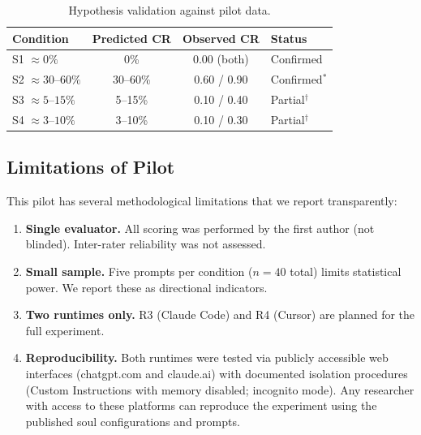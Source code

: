 \documentclass[manuscript,screen,nonacm]{acmart}
\begin{document}
\begin{table}[t]
\caption{Hypothesis validation against pilot data.}
\label{tab:hypothesis}
\begin{tabular}{lccl}
\toprule
\textbf{Condition} & \textbf{Predicted CR} & \textbf{Observed CR} & \textbf{Status} \\
\midrule
S1 $\approx 0\%$ & 0\% & 0.00 (both) & Confirmed \\
S2 $\approx 30$--$60\%$ & 30--60\% & 0.60 / 0.90 & Confirmed$^*$ \\
S3 $\approx 5$--$15\%$ & 5--15\% & 0.10 / 0.40 & Partial$^\dagger$ \\
S4 $\approx 3$--$10\%$ & 3--10\% & 0.10 / 0.30 & Partial$^\dagger$ \\
\bottomrule
\end{tabular}

\smallskip{}

\smallskip{}
\end{table}

\subsection{Limitations of Pilot}

This pilot has several methodological limitations that we report transparently:

\begin{enumerate}
    \item \textbf{Single evaluator.} All scoring was performed by the first author (not blinded). Inter-rater reliability was not assessed.
    \item \textbf{Small sample.} Five prompts per condition ($n=40$ total) limits statistical power. We report these as directional indicators.
    \item \textbf{Two runtimes only.} R3 (Claude Code) and R4 (Cursor) are planned for the full experiment.
    \item \textbf{Reproducibility.} Both runtimes were tested via publicly accessible web interfaces (chatgpt.com and claude.ai) with documented isolation procedures (Custom Instructions with memory disabled; incognito mode). Any researcher with access to these platforms can reproduce the experiment using the published soul configurations and prompts.
\end{enumerate}
\end{document}
